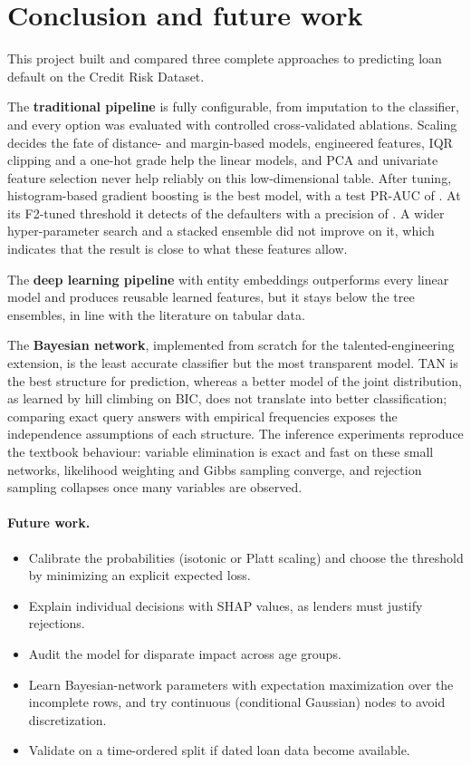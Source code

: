\section{Conclusion and future work}
\label{sec:conclusion}

This project built and compared three complete approaches to predicting loan default on the Credit Risk Dataset.

The \textbf{traditional pipeline} is fully configurable, from imputation to the classifier, and every option was evaluated with controlled cross-validated ablations.
Scaling decides the fate of distance- and margin-based models, engineered features, IQR clipping and a one-hot grade help the linear models, and PCA and univariate feature selection never help reliably on this low-dimensional table.
After tuning, histogram-based gradient boosting is the best model, with a test PR-AUC of \BestPrAuc{}.
At its F2-tuned threshold it detects \BestRecall{} of the defaulters with a precision of \BestPrecision{}.
A wider hyper-parameter search and a stacked ensemble did not improve on it, which indicates that the result is close to what these features allow.

The \textbf{deep learning pipeline} with entity embeddings outperforms every linear model and produces reusable learned features, but it stays below the tree ensembles, in line with the literature on tabular data.

The \textbf{Bayesian network}, implemented from scratch for the talented-engineering extension, is the least accurate classifier but the most transparent model.
TAN is the best structure for prediction, whereas a better model of the joint distribution, as learned by hill climbing on BIC, does not translate into better classification; comparing exact query answers with empirical frequencies exposes the independence assumptions of each structure.
The inference experiments reproduce the textbook behaviour: variable elimination is exact and fast on these small networks, likelihood weighting and Gibbs sampling converge, and rejection sampling collapses once many variables are observed.

\paragraph{Future work.}
\begin{itemize}[nosep]
  \item Calibrate the probabilities (isotonic or Platt scaling) and choose the threshold by minimizing an explicit expected loss.
  \item Explain individual decisions with SHAP values, as lenders must justify rejections.
  \item Audit the model for disparate impact across age groups.
  \item Learn Bayesian-network parameters with expectation maximization over the incomplete rows, and try continuous (conditional Gaussian) nodes to avoid discretization.
  \item Validate on a time-ordered split if dated loan data become available.
\end{itemize}
